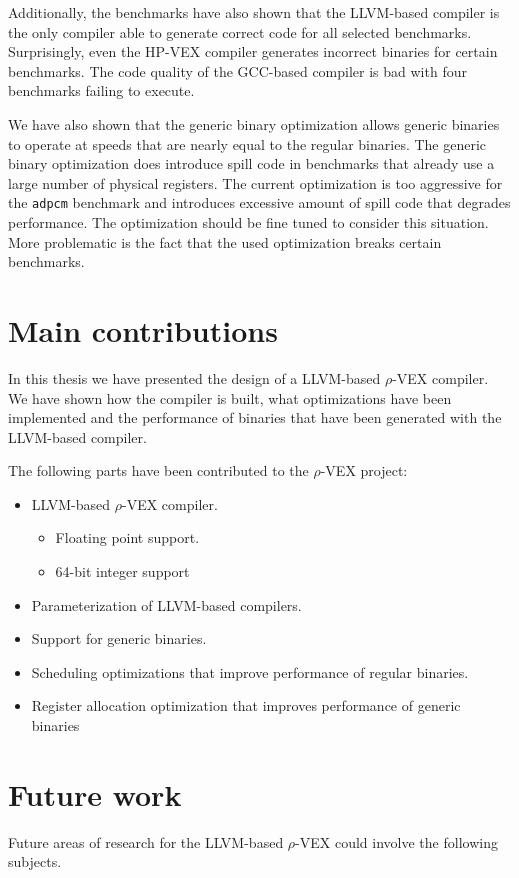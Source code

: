 Additionally, the benchmarks have also shown that the LLVM-based compiler is the only compiler able to generate correct code for all selected benchmarks. Surprisingly, even the HP-VEX compiler generates incorrect binaries for certain benchmarks. The code quality of the GCC-based compiler is bad with four benchmarks failing to execute.

We have also shown that the generic binary optimization allows generic binaries to operate at speeds that are nearly equal to the regular binaries. The generic binary optimization does introduce spill code in benchmarks that already use a large number of physical registers. The current optimization is too aggressive for the \texttt{adpcm} benchmark and introduces excessive amount of spill code that degrades performance. The optimization should be fine tuned to consider this situation. More problematic is the fact that the used optimization breaks certain benchmarks.

\section{Main contributions}
In this thesis we have presented the design of a LLVM-based $\rho$-VEX compiler. We have shown how the compiler is built, what optimizations have been implemented and the performance of binaries that have been generated with the LLVM-based compiler.

The following parts have been contributed to the $\rho$-VEX project:

\begin{itemize}
	\item LLVM-based $\rho$-VEX compiler.
	\begin{itemize}
		\item Floating point support.
		\item 64-bit integer support
	\end{itemize}
	\item Parameterization of LLVM-based compilers.
	\item Support for generic binaries.
	\item Scheduling optimizations that improve performance of regular binaries.
	\item Register allocation optimization that improves performance of generic binaries
\end{itemize}

\section{Future work}
Future areas of research for the LLVM-based $\rho$-VEX could involve the following subjects.

